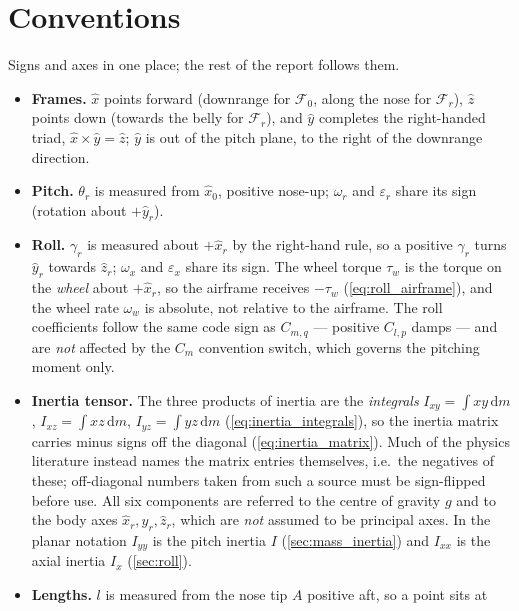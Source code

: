 \section{Conventions}\label{sec:conventions}
Signs and axes in one place; the rest of the report follows them.
\begin{itemize}
    \item \textbf{Frames.} $\hat{x}$ points forward (downrange for $\mathcal{F}_0$, along the nose
    for $\mathcal{F}_r$), $\hat{z}$ points down (towards the belly for $\mathcal{F}_r$), and $\hat{y}$
    completes the right-handed triad, $\hat{x}\times\hat{y}=\hat{z}$; $\hat{y}$ is out of the pitch
    plane, to the right of the downrange direction.
    \item \textbf{Pitch.} $\theta_r$ is measured from $\hat{x}_0$, positive nose-up; $\omega_r$
    and $\varepsilon_r$ share its sign (rotation about $+\hat{y}_r$).
    \item \textbf{Roll.} $\gamma_r$ is measured about $+\hat{x}_r$ by the right-hand rule, so a
    positive $\gamma_r$ turns $\hat{y}_r$ towards $\hat{z}_r$; $\omega_x$ and $\varepsilon_x$ share
    its sign. The wheel torque $\tau_w$ is the torque on the \emph{wheel} about $+\hat{x}_r$, so
    the airframe receives $-\tau_w$ (\autoref{eq:roll_airframe}), and the wheel rate $\omega_w$ is
    absolute, not relative to the airframe. The roll coefficients follow the same code sign as
    $C_{m,q}$ --- positive $C_{l,p}$ damps --- and are \emph{not} affected by the $C_m$ convention
    switch, which governs the pitching moment only.
    \item \textbf{Inertia tensor.} The three products of inertia are the \emph{integrals}
    $I_{xy}=\int xy\,\mathrm{d}m$, $I_{xz}=\int xz\,\mathrm{d}m$, $I_{yz}=\int yz\,\mathrm{d}m$
    (\autoref{eq:inertia_integrals}), so the inertia matrix carries minus signs off the diagonal
    (\autoref{eq:inertia_matrix}). Much of the physics literature instead names the matrix entries
    themselves, i.e.\ the negatives of these; off-diagonal numbers taken from such a source must be
    sign-flipped before use. All six components are referred to the centre of gravity $g$ and to the
    body axes $\hat{x}_r,\hat{y}_r,\hat{z}_r$, which are \emph{not} assumed to be principal axes.
    In the planar notation $I_{yy}$ is the pitch inertia $I$ (\autoref{sec:mass_inertia}) and
    $I_{xx}$ is the axial inertia $I_x$ (\autoref{sec:roll}).
    \item \textbf{Lengths.} $l$ is measured from the nose tip $A$ positive aft, so a point sits at

\end{itemize}
